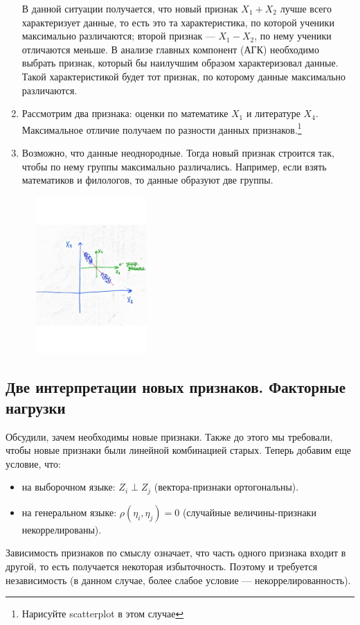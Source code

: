 \documentclass[specialist, 12pt,
subf, %
href, colorlinks=true,
substylefile = spbu.rtx,
]{disser}
\begin{document}
\begin{enumerate}
В данной ситуации получается, что новый признак $X_1 + X_2$ лучше всего характеризует данные, то есть это та характеристика, по которой ученики максимально различаются; второй признак --- $X_1 - X_2$, по нему ученики отличаются меньше. В анализе главных компонент (АГК) необходимо выбрать признак, который бы наилучшим образом характеризовал данные. Такой характеристикой будет тот признак, по которому данные максимально различаются.

\item  Рассмотрим два признака: оценки по математике $X_1$ и литературе $X_4$. Максимальное отличие получаем по разности данных признаков.\footnote{Нарисуйте scatterplot в этом случае}	

\item Возможно, что данные неоднородные. Тогда новый признак строится так, чтобы по нему группы
максимально различались. Например, если взять математиков и филологов, то данные образуют две группы.

\begin{center}
	\begin{minipage}{0.51\linewidth}
		\centering
		\includegraphics[width=150pt, height=170pt]{p11}
		\label{10}
	\end{minipage}
\end{center}
\end{enumerate}

\subsection{Две интерпретации новых признаков. Факторные нагрузки}
Обсудили, зачем необходимы новые признаки. Также до этого мы требовали, чтобы новые признаки были линейной комбинацией старых. Теперь добавим еще условие, что:
\begin{itemize}
	\item на выборочном языке: $Z_i \perp Z_j$ (вектора-признаки ортогональны).
	\item на генеральном языке: $\rho(\eta_i, \eta_j) = 0$ (случайные величины-признаки некоррелированы).
\end{itemize}
Зависимость признаков по смыслу означает, что часть одного признака входит в другой, то есть получается некоторая избыточность. Поэтому и требуется независимость (в данном случае, более слабое условие --- некоррелированность).
\end{document}
